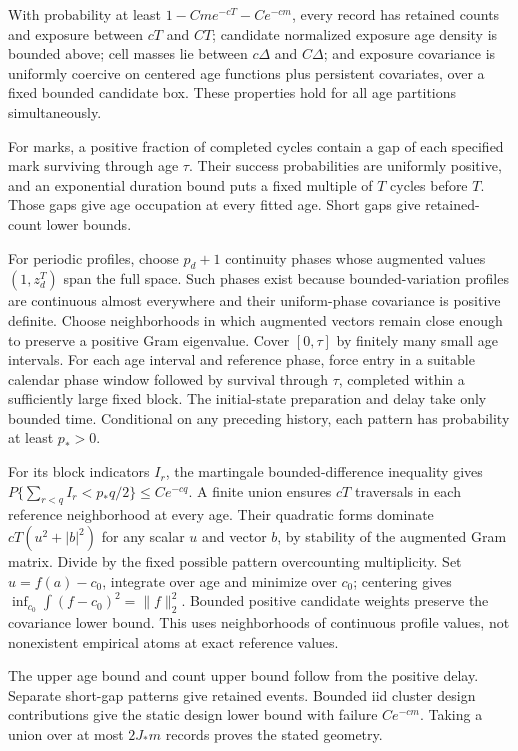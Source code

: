 \documentclass[11pt]{article}
\begin{document}
With probability at least \(1-Cm e^{-cT}-Ce^{-cm}\), every record has retained counts and exposure between \(cT\) and \(CT\); candidate normalized exposure age density is bounded above; cell masses lie between \(c\Delta\) and \(C\Delta\); and exposure covariance is uniformly coercive on centered age functions plus persistent covariates, over a fixed bounded candidate box. These properties hold for all age partitions simultaneously.

For marks, a positive fraction of completed cycles contain a gap of each specified mark surviving through age \(\tau\). Their success probabilities are uniformly positive, and an exponential duration bound puts a fixed multiple of \(T\) cycles before \(T\). Those gaps give age occupation at every fitted age. Short gaps give retained-count lower bounds.

For periodic profiles, choose \(p_d+1\) continuity phases whose augmented values \((1,z_d^T)\) span the full space. Such phases exist because bounded-variation profiles are continuous almost everywhere and their uniform-phase covariance is positive definite. Choose neighborhoods in which augmented vectors remain close enough to preserve a positive Gram eigenvalue. Cover \([0,\tau]\) by finitely many small age intervals. For each age interval and reference phase, force entry in a suitable calendar phase window followed by survival through \(\tau\), completed within a sufficiently large fixed block. The initial-state preparation and delay take only bounded time. Conditional on any preceding history, each pattern has probability at least \(p_*>0\).

For its block indicators \(I_r\), the martingale bounded-difference inequality gives
\(P\{\sum_{r<q}I_r<p_*q/2\}\leq Ce^{-cq}\). A finite union ensures \(cT\) traversals in each reference neighborhood at every age. Their quadratic forms dominate \(cT(u^2+|b|^2)\) for any scalar \(u\) and vector \(b\), by stability of the augmented Gram matrix. Divide by the fixed possible pattern overcounting multiplicity. Set \(u=f(a)-c_0\), integrate over age and minimize over \(c_0\); centering gives
\(\inf_{c_0}\int(f-c_0)^2=\|f\|_2^2\).
Bounded positive candidate weights preserve the covariance lower bound. This uses neighborhoods of continuous profile values, not nonexistent empirical atoms at exact reference values.

The upper age bound and count upper bound follow from the positive delay. Separate short-gap patterns give retained events. Bounded iid cluster design contributions give the static design lower bound with failure \(Ce^{-cm}\). Taking a union over at most \(2J_*m\) records proves the stated geometry.
\end{document}
